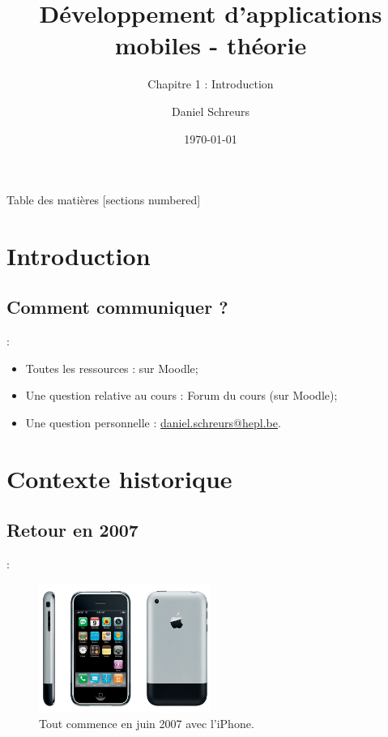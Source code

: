 \documentclass[10pt]{beamer}
\title{Développement d'applications mobiles - théorie}
\subtitle{Chapitre 1 : Introduction}
\date{\today}
\author{Daniel Schreurs}
\institute{Haute École de la Province de Liège}
\begin{document}
\maketitle

\begin{frame}[allowframebreaks]{Table des matières}
    [sections numbered]
    \tableofcontents
\end{frame}

\section{Introduction}

\subsection{Comment communiquer ?}
\begin{frame}{\secname : \subsecname}
    \begin{itemize}
        \item Toutes les ressources : sur Moodle;
        \item Une question relative au cours : Forum du cours (sur Moodle);
        \item Une question personnelle : \href{mailto:daniel.schreurs@hepl.be}{daniel.schreurs@hepl.be}.
    \end{itemize}
\end{frame}

\section{Contexte historique}
\subsection{Retour en 2007}
\begin{frame}[fragile,t]{\secname : \subsecname}
    \begin{figure}
        \begin{center}
            \includegraphics[width=0.5\textwidth]{../assets/img/Originele-iPhone.jpg}
            \caption*{Tout commence en juin 2007 avec l'iPhone.}
            \label{Fig:Originele-iPhone}
        \end{center}
    \end{figure}
\end{frame}
\end{document}
